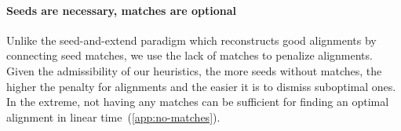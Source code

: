 \paragraph{Seeds are necessary, matches are optional}\label{sec:seeding}

Unlike the seed-and-extend paradigm which reconstructs good alignments by
connecting seed matches, we use the lack of matches to penalize alignments.
Given the admissibility of our heuristics, the more seeds without matches, the
higher the penalty for alignments and the easier it is to dismiss suboptimal
ones. In the extreme, not having any matches can be sufficient for finding an
optimal alignment in linear time~(\cref{app:no-matches}).
